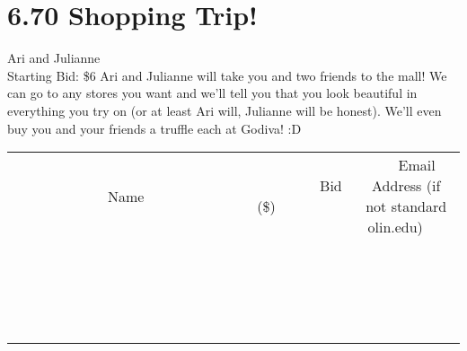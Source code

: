 \documentclass[11pt]{article}
\begin{document}
\section*{6.70 Shopping Trip!}
Ari and Julianne
\\
Starting Bid: \$6
\newline
Ari and Julianne will take you and two friends to the mall! We can go to any stores you want and we'll tell you that you look beautiful in everything you try on (or at least Ari will, Julianne will be honest). We'll even buy you and your friends a truffle each at Godiva! :D
\\[3ex]
\begin{tabular}{c c c}
~~~~~~~~~~~~~Name~~~~~~~~~~~~~ & ~~~~~~~~~Bid (\$)~~~~~~~~~  & ~~~Email Address (if not standard olin.edu)~~~\\
 & & \\
\hline
 & & \\
\hline
 & & \\
\hline
 & & \\
\hline
 & & \\
\hline
 & & \\
\hline
 & & \\
\hline
 & & \\
\hline
 & & \\
\hline
 & & \\
\hline
 & & \\
\hline
 & & \\
\hline
 & & \\
\hline
 & & \\
\hline
 & & \\
\hline
 & & \\
\hline
 & & \\
\hline
 & & \\
\hline
 & & \\
\hline
\end{tabular}
\newpage
\end{document}
